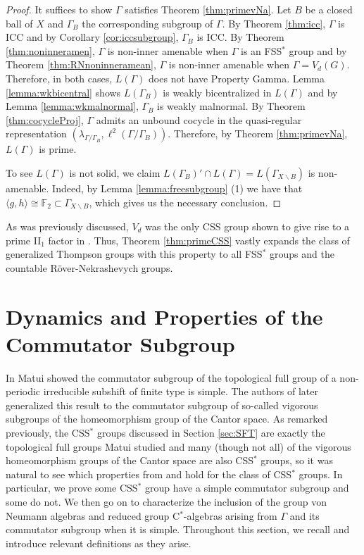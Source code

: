 \documentclass[12pt]{amsart}
\numberwithin{equation}{subsection}
\theoremstyle{definition}
\theoremstyle{definition}
\theoremstyle{remark}
\begin{document}
\begin{proof}
    It suffices to show $\Gamma$ satisfies Theorem \ref{thm:primevNa}. Let $B$ be a closed ball of $X$ and $\Gamma_B$ the corresponding subgroup of $\Gamma$. By Theorem \ref{thm:icc}, $\Gamma$ is ICC and by Corollary \ref{cor:iccsubgroup}, $\Gamma_B$ is ICC. By Theorem \ref{thm:noninneramen}, $\Gamma$ is non-inner amenable when $\Gamma$ is an FSS$^*$ group and by Theorem \ref{thm:RNnoninneramean}, $\Gamma$ is non-inner amenable when $\Gamma = V_d(G)$. Therefore, in both cases, $L(\Gamma)$ does not have Property Gamma. Lemma \ref{lemma:wkbicentral} shows $L(\Gamma_B)$ is weakly bicentralized in $L(\Gamma)$ and by Lemma \ref{lemma:wkmalnormal}, $\Gamma_B$ is weakly malnormal. By Theorem \ref{thm:cocycleProj}, $\Gamma$ admits an unbound cocycle in the quasi-regular representation $(\lambda_{\Gamma / \Gamma_B},\ell^2(\Gamma / \Gamma_B))$. Therefore, by Theorem \ref{thm:primevNa}, $L(\Gamma)$ is prime.

    To see $L(\Gamma)$ is not solid, we claim $L(\Gamma_B)'\cap L(\Gamma) = L(\Gamma_{X \backslash B})$ is non-amenable. Indeed, by Lemma \ref{lemma:freesubgroup} (1) we have that $\langle g, h \rangle \cong \mathbb F_2 \subset \Gamma_{X \backslash B}$, which gives us the necessary conclusion. 
    
\end{proof}

As was previously discussed, $V_d$ was the only CSS group shown to give rise to a prime II$_1$ factor in \cite{de2023mcduff}. Thus, Theorem \ref{thm:primeCSS} vastly expands the class of generalized Thompson groups with this property to all FSS$^*$ groups and the countable R\"over-Nekrashevych groups.



\section{Dynamics and Properties of the Commutator Subgroup}\label{sec:PropofComm}

In \cite{Matui20215SFT} Matui showed the commutator subgroup of the topological full group of a non-periodic irreducible subshift of finite type is simple. The authors of \cite{BleakEtAll2023} later generalized this result to the commutator subgroup of so-called vigorous subgroups of the homeomorphism group of the Cantor space. As remarked previously, the CSS$^*$ groups discussed in Section \ref{sec:SFT} are exactly the topological full groups Matui studied and many (though not all) of the vigorous homeomorphism groups of the Cantor space are also CSS$^*$ groups, so it was natural to see which properties from \cite{Matui20215SFT} and \cite{BleakEtAll2023} hold for the class of CSS$^*$ groups. In particular, we prove some CSS$^*$ group have a simple commutator subgroup and some do not. We then go on to characterize the inclusion of the group von Neumann algebras and reduced group C$^*$-algebras arising from $\Gamma$ and its commutator subgroup when it is simple. Throughout this section, we recall and introduce relevant definitions as they arise. 
\end{document}
